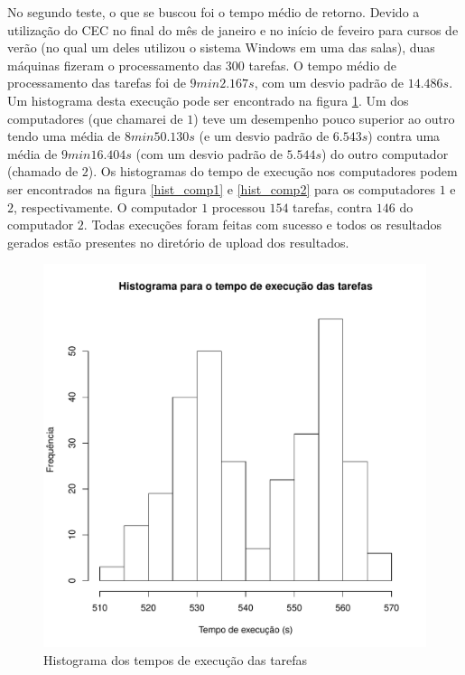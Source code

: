 No segundo teste, o que se buscou foi o tempo médio de retorno. Devido a utilização do CEC no final do mês de janeiro e no início de feveiro para cursos de verão (no qual um deles utilizou o sistema Windows em uma das salas), duas máquinas fizeram o processamento das $300$ tarefas. O tempo médio 
de processamento das tarefas foi de $9min2.167s$, com um desvio padrão de $14.486s$. Um histograma desta execução pode 
ser encontrado na figura \ref{hist_tarefas}. Um dos computadores (que chamarei de $1$) teve um desempenho pouco superior ao outro tendo uma
média de $8min50.130s$ (e um desvio padrão de $6.543s$) contra uma média de $9min16.404s$ (com um desvio padrão de $5.544s$) do outro computador (chamado de $2$). Os histogramas do tempo de execução nos computadores podem ser encontrados na figura \ref{hist_comp1} e \ref{hist_comp2} para os computadores $1$ e $2$, respectivamente. O computador $1$ processou $154$ tarefas, contra $146$ do computador $2$. Todas 
execuções foram feitas com sucesso e todos os resultados gerados estão presentes no diretório de upload dos resultados. 

\begin{figure}[!ht]
	\includegraphics[scale=0.8]{hist_geral.pdf}

	\caption{Histograma dos tempos de execução das tarefas}
	\label{hist_tarefas}
\end{figure}


